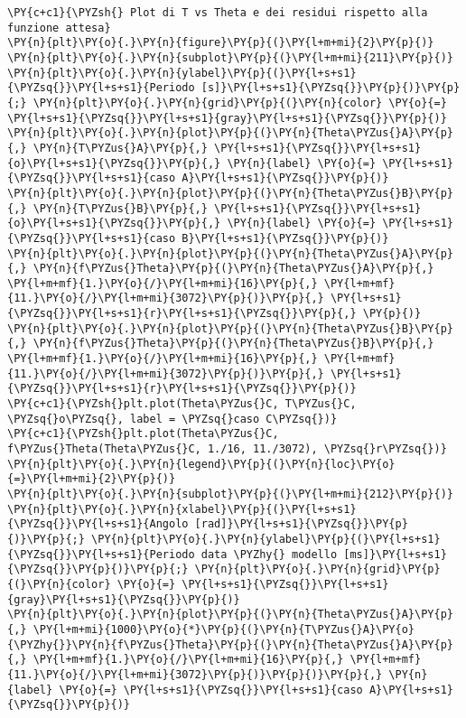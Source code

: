 \begin{Verbatim}[label=\makebox{\href{https://github.com/unipi-physics-labs/lab1-sheets/tree/main/snippy/plasduino_pendulum_testT.py}{https://github.com/.../plasduino\_pendulum\_testT.py}},commandchars=\\\{\}]
\PY{c+c1}{\PYZsh{} Plot di T vs Theta e dei residui rispetto alla funzione attesa}
\PY{n}{plt}\PY{o}{.}\PY{n}{figure}\PY{p}{(}\PY{l+m+mi}{2}\PY{p}{)}
\PY{n}{plt}\PY{o}{.}\PY{n}{subplot}\PY{p}{(}\PY{l+m+mi}{211}\PY{p}{)}
\PY{n}{plt}\PY{o}{.}\PY{n}{ylabel}\PY{p}{(}\PY{l+s+s1}{\PYZsq{}}\PY{l+s+s1}{Periodo [s]}\PY{l+s+s1}{\PYZsq{}}\PY{p}{)}\PY{p}{;} \PY{n}{plt}\PY{o}{.}\PY{n}{grid}\PY{p}{(}\PY{n}{color} \PY{o}{=} \PY{l+s+s1}{\PYZsq{}}\PY{l+s+s1}{gray}\PY{l+s+s1}{\PYZsq{}}\PY{p}{)}
\PY{n}{plt}\PY{o}{.}\PY{n}{plot}\PY{p}{(}\PY{n}{Theta\PYZus{}A}\PY{p}{,} \PY{n}{T\PYZus{}A}\PY{p}{,} \PY{l+s+s1}{\PYZsq{}}\PY{l+s+s1}{o}\PY{l+s+s1}{\PYZsq{}}\PY{p}{,} \PY{n}{label} \PY{o}{=} \PY{l+s+s1}{\PYZsq{}}\PY{l+s+s1}{caso A}\PY{l+s+s1}{\PYZsq{}}\PY{p}{)}
\PY{n}{plt}\PY{o}{.}\PY{n}{plot}\PY{p}{(}\PY{n}{Theta\PYZus{}B}\PY{p}{,} \PY{n}{T\PYZus{}B}\PY{p}{,} \PY{l+s+s1}{\PYZsq{}}\PY{l+s+s1}{o}\PY{l+s+s1}{\PYZsq{}}\PY{p}{,} \PY{n}{label} \PY{o}{=} \PY{l+s+s1}{\PYZsq{}}\PY{l+s+s1}{caso B}\PY{l+s+s1}{\PYZsq{}}\PY{p}{)}
\PY{n}{plt}\PY{o}{.}\PY{n}{plot}\PY{p}{(}\PY{n}{Theta\PYZus{}A}\PY{p}{,} \PY{n}{f\PYZus{}Theta}\PY{p}{(}\PY{n}{Theta\PYZus{}A}\PY{p}{,} \PY{l+m+mf}{1.}\PY{o}{/}\PY{l+m+mi}{16}\PY{p}{,} \PY{l+m+mf}{11.}\PY{o}{/}\PY{l+m+mi}{3072}\PY{p}{)}\PY{p}{,} \PY{l+s+s1}{\PYZsq{}}\PY{l+s+s1}{r}\PY{l+s+s1}{\PYZsq{}}\PY{p}{,} \PY{p}{)}
\PY{n}{plt}\PY{o}{.}\PY{n}{plot}\PY{p}{(}\PY{n}{Theta\PYZus{}B}\PY{p}{,} \PY{n}{f\PYZus{}Theta}\PY{p}{(}\PY{n}{Theta\PYZus{}B}\PY{p}{,} \PY{l+m+mf}{1.}\PY{o}{/}\PY{l+m+mi}{16}\PY{p}{,} \PY{l+m+mf}{11.}\PY{o}{/}\PY{l+m+mi}{3072}\PY{p}{)}\PY{p}{,} \PY{l+s+s1}{\PYZsq{}}\PY{l+s+s1}{r}\PY{l+s+s1}{\PYZsq{}}\PY{p}{)}
\PY{c+c1}{\PYZsh{}plt.plot(Theta\PYZus{}C, T\PYZus{}C, \PYZsq{}o\PYZsq{}, label = \PYZsq{}caso C\PYZsq{})}
\PY{c+c1}{\PYZsh{}plt.plot(Theta\PYZus{}C, f\PYZus{}Theta(Theta\PYZus{}C, 1./16, 11./3072), \PYZsq{}r\PYZsq{})}
\PY{n}{plt}\PY{o}{.}\PY{n}{legend}\PY{p}{(}\PY{n}{loc}\PY{o}{=}\PY{l+m+mi}{2}\PY{p}{)}
\PY{n}{plt}\PY{o}{.}\PY{n}{subplot}\PY{p}{(}\PY{l+m+mi}{212}\PY{p}{)}
\PY{n}{plt}\PY{o}{.}\PY{n}{xlabel}\PY{p}{(}\PY{l+s+s1}{\PYZsq{}}\PY{l+s+s1}{Angolo [rad]}\PY{l+s+s1}{\PYZsq{}}\PY{p}{)}\PY{p}{;} \PY{n}{plt}\PY{o}{.}\PY{n}{ylabel}\PY{p}{(}\PY{l+s+s1}{\PYZsq{}}\PY{l+s+s1}{Periodo data \PYZhy{} modello [ms]}\PY{l+s+s1}{\PYZsq{}}\PY{p}{)}\PY{p}{;} \PY{n}{plt}\PY{o}{.}\PY{n}{grid}\PY{p}{(}\PY{n}{color} \PY{o}{=} \PY{l+s+s1}{\PYZsq{}}\PY{l+s+s1}{gray}\PY{l+s+s1}{\PYZsq{}}\PY{p}{)}
\PY{n}{plt}\PY{o}{.}\PY{n}{plot}\PY{p}{(}\PY{n}{Theta\PYZus{}A}\PY{p}{,} \PY{l+m+mi}{1000}\PY{o}{*}\PY{p}{(}\PY{n}{T\PYZus{}A}\PY{o}{\PYZhy{}}\PY{n}{f\PYZus{}Theta}\PY{p}{(}\PY{n}{Theta\PYZus{}A}\PY{p}{,} \PY{l+m+mf}{1.}\PY{o}{/}\PY{l+m+mi}{16}\PY{p}{,} \PY{l+m+mf}{11.}\PY{o}{/}\PY{l+m+mi}{3072}\PY{p}{)}\PY{p}{)}\PY{p}{,} \PY{n}{label} \PY{o}{=} \PY{l+s+s1}{\PYZsq{}}\PY{l+s+s1}{caso A}\PY{l+s+s1}{\PYZsq{}}\PY{p}{)}

\end{Verbatim}
